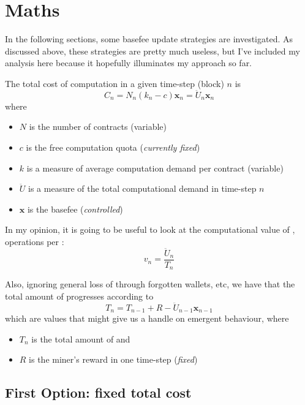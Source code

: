 \documentclass[11pt,a4paper]{article}
\begin{document}
\section*{Maths}

\def\x{\ensuremath{\mathbf x}\xspace}
\def\U{\ensuremath{\ddot{U}}\xspace}
\def\prediction{^{*}}
\def\Up{\ensuremath{\U\prediction}}

\renewcommand{\labelitemi}{$\cdot$}

In the following sections, some basefee update strategies are investigated. As discussed above, these strategies are pretty much useless, but I've included my analysis here because it hopefully illuminates my approach so far. 

The total cost of computation in a given time-step (block) $n$ is 
\begin{equation}
C_n = N_n(k_n - c)\x_n = \U_n\x_n
\end{equation}
where 
\begin{itemize}
\item $N$ is the number of contracts (variable)
\item $c$ is the free computation quota ({\it currently fixed})
\item $k$ is a measure of average computation demand per contract (variable)
\item \U is a measure of the total computational demand in time-step $n$
\item \x is the basefee ({\it controlled})
\end{itemize}

In my opinion, it is going to be useful to look at the computational value of \ether, \ie operations per \ether:
\begin{equation}
v_n = \frac{\U_n}{T_n}
\end{equation}

Also, ignoring general loss of \ether through forgotten wallets, etc, we have that the total amount of \ether progresses according to
\begin{equation}
T_n = T_{n-1} + R - \U_{n-1}\x_{n-1}
\end{equation}
which are values that might give us a handle on emergent behaviour, where
\begin{itemize}
\item $T_n$ is the total amount of \ether and
\item $R$ is the miner's reward in one time-step ({\it fixed})
\end{itemize}

\subsection*{First Option: fixed total cost}
\end{document}
